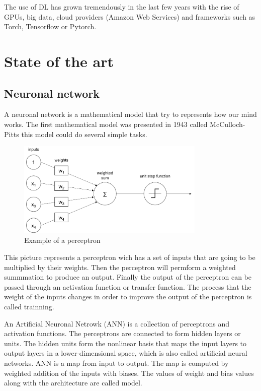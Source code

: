 The use of DL has grown tremendously in the last few years with the rise of GPUs, big data, cloud providers (Amazon Web Services) and frameworks such as Torch, Tensorflow or Pytorch.


\section{State of the art}
\subsection[Neuronal network]{Neuronal network}

A neuronal network is a mathematical model that try to represents how our mind works. The first mathematical model was presented in 1943 called McCulloch-Pitts this model could do several simple tasks. \cite{fsancho}

\begin{figure}[H]
\centering
\includegraphics[width=0.8\textwidth]{./figures/perceptron}
\caption{Example of a perceptron \cite{rajalingappaa}}
\end{figure}
	
	
This picture represents a perceptron wich has a set of inputs that are going to be multiplied by their weights.
Then the perceptron will permform a weighted summmation to produce an output. \cite{sagar} Finally the output of the perceptron can be passed through an activation function or transfer function.\cite{rajalingappaa}
The process that the weight of the inputs changes in order to improve the output of the perceptron is called trainning. 

An Artificial Neuronal Netrowk (ANN) is a collection of perceptrons and activation functions. The perceptrons are connected to form hidden layers or units. The hidden units form the nonlinear basis that maps the input layers to output layers in a lower-dimensional space, which is also called artificial neural networks. ANN is a map from input to output. The map is computed by weighted addition of the inputs with biases. The values of weight and bias values along with the architecture are called model.


